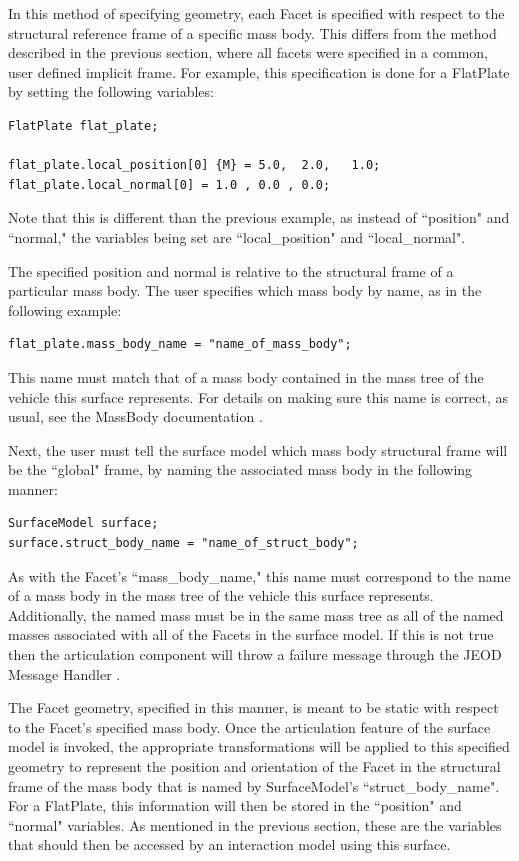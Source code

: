 In this method of specifying geometry, each Facet is specified with respect
to the structural reference frame of a specific mass body. This differs
from the method described in the previous section, where all facets
were specified in a common, user defined implicit frame. For example,
this specification is done for a FlatPlate by setting the following
variables:

\begin{verbatim}
FlatPlate flat_plate;

flat_plate.local_position[0] {M} = 5.0,  2.0,   1.0;
flat_plate.local_normal[0] = 1.0 , 0.0 , 0.0; 
\end{verbatim}

Note that this is different than the previous example, as instead of
``position" and ``normal," the variables being set are
``local\_position" and ``local\_normal". 

The specified position and normal
is relative to the structural frame of a particular mass body. The
user specifies which mass body by name, as in the following
example:

\begin{verbatim}
flat_plate.mass_body_name = "name_of_mass_body";
\end{verbatim}

This name must match that of a mass body contained in the
mass tree of the vehicle this surface represents. For details
on making sure this name is correct, as usual, see the
MassBody documentation \cite{dynenv:MASS}.

Next, the user must tell the surface model which mass body
structural frame will be the ``global" frame, by naming the 
associated mass body in the following manner:

\begin{verbatim}
SurfaceModel surface;
surface.struct_body_name = "name_of_struct_body";
\end{verbatim}

As with the Facet's ``mass\_body\_name," this name must correspond to the
name of a mass body in the mass tree of the vehicle this surface
represents. Additionally, the named mass must be in the same mass tree
as all of the named masses associated with all of the Facets in the
surface model. If this is not true then the articulation component
will throw a failure message through the JEOD Message Handler
\cite{dynenv:MESSAGE}.

The Facet geometry, specified in this manner, is meant to be static with
respect to the Facet's specified mass body. Once the articulation feature
of the surface model is invoked, the appropriate transformations
will be applied to this specified geometry to represent the position
and orientation of the Facet in the structural frame
of the mass body that is named by SurfaceModel's ``struct\_body\_name". For a FlatPlate,
this information will then be stored in the ``position" and ``normal" variables.
As mentioned in the previous section, these are the variables that should then
be accessed by an interaction model using this surface.

